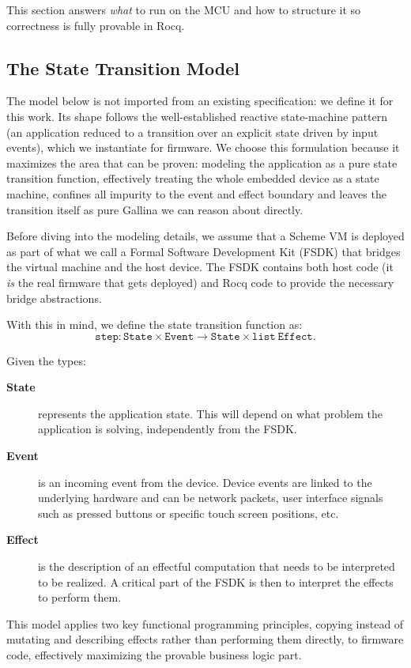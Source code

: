 \documentclass[runningheads]{llncs}
\newcommand{\code}[1]{\texttt{#1}}
\begin{document}
This section answers \emph{what} to run on the MCU and how to structure it so correctness is fully provable in Rocq.

\subsection{The State Transition Model}

The model below is not imported from an existing specification: we define it for this work.
Its shape follows the well-established reactive state-machine pattern (an application reduced to a transition over an explicit state driven by input events), which we instantiate for firmware.
We choose this formulation because it maximizes the area that can be proven: modeling the application as a pure state transition function, effectively treating the whole embedded device as a state machine, confines all impurity to the event and effect boundary and leaves the transition itself as pure Gallina we can reason about directly.

Before diving into the modeling details, we assume that a Scheme VM is deployed as part of what we call a Formal Software Development Kit (FSDK) that bridges the virtual machine and the host device.
The FSDK contains both host code (it \emph{is} the real firmware that gets deployed) and Rocq code to provide the necessary bridge abstractions.

With this in mind, we define the state transition function as:
\[
  \code{step} : \code{State} \times \code{Event} \rightarrow \code{State} \times \code{list}\ \code{Effect}.
\]

Given the types:
\begin{description}
  \item[\textbf{State}] represents the application state. This will depend on what problem the application is solving, independently from the FSDK.
  \item[\textbf{Event}] is an incoming event from the device. Device events are linked to the underlying hardware and can be network packets, user interface signals such as pressed buttons or specific touch screen positions, etc.
  \item[\textbf{Effect}] is the description of an effectful computation that needs to be interpreted to be realized. A critical part of the FSDK is then to interpret the effects to perform them.
\end{description}

This model applies two key functional programming principles, copying instead of mutating and describing effects rather than performing them directly, to firmware code, effectively maximizing the provable business logic part.
\end{document}
